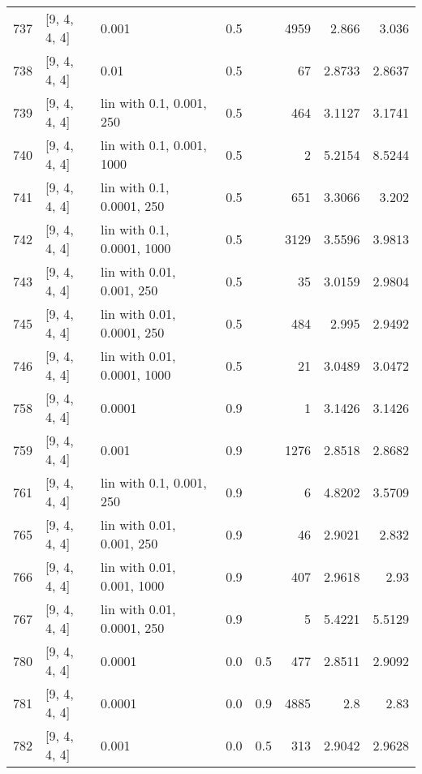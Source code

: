 \begin{longtable}{lllrrrrr}
  737 &       [9, 4, 4, 4] &                       0.001 &      0.5 &     & 4959 &    2.866 &    3.036 \\
  738 &       [9, 4, 4, 4] &                        0.01 &      0.5 &     &   67 &   2.8733 &   2.8637 \\
  739 &       [9, 4, 4, 4] &    lin with 0.1, 0.001, 250 &      0.5 &     &  464 &   3.1127 &   3.1741 \\
  740 &       [9, 4, 4, 4] &   lin with 0.1, 0.001, 1000 &      0.5 &     &    2 &   5.2154 &   8.5244 \\
  741 &       [9, 4, 4, 4] &   lin with 0.1, 0.0001, 250 &      0.5 &     &  651 &   3.3066 &    3.202 \\
  742 &       [9, 4, 4, 4] &  lin with 0.1, 0.0001, 1000 &      0.5 &     & 3129 &   3.5596 &   3.9813 \\
  743 &       [9, 4, 4, 4] &   lin with 0.01, 0.001, 250 &      0.5 &     &   35 &   3.0159 &   2.9804 \\
  745 &       [9, 4, 4, 4] &  lin with 0.01, 0.0001, 250 &      0.5 &     &  484 &    2.995 &   2.9492 \\
  746 &       [9, 4, 4, 4] & lin with 0.01, 0.0001, 1000 &      0.5 &     &   21 &   3.0489 &   3.0472 \\
  758 &       [9, 4, 4, 4] &                      0.0001 &      0.9 &     &    1 &   3.1426 &   3.1426 \\
  759 &       [9, 4, 4, 4] &                       0.001 &      0.9 &     & 1276 &   2.8518 &   2.8682 \\
  761 &       [9, 4, 4, 4] &    lin with 0.1, 0.001, 250 &      0.9 &     &    6 &   4.8202 &   3.5709 \\
  765 &       [9, 4, 4, 4] &   lin with 0.01, 0.001, 250 &      0.9 &     &   46 &   2.9021 &    2.832 \\
  766 &       [9, 4, 4, 4] &  lin with 0.01, 0.001, 1000 &      0.9 &     &  407 &   2.9618 &     2.93 \\
  767 &       [9, 4, 4, 4] &  lin with 0.01, 0.0001, 250 &      0.9 &     &    5 &   5.4221 &   5.5129 \\
  780 &       [9, 4, 4, 4] &                      0.0001 &      0.0 & 0.5 &  477 &   2.8511 &   2.9092 \\
  781 &       [9, 4, 4, 4] &                      0.0001 &      0.0 & 0.9 & 4885 &      2.8 &     2.83 \\
  782 &       [9, 4, 4, 4] &                       0.001 &      0.0 & 0.5 &  313 &   2.9042 &   2.9628 \\

\end{longtable}
